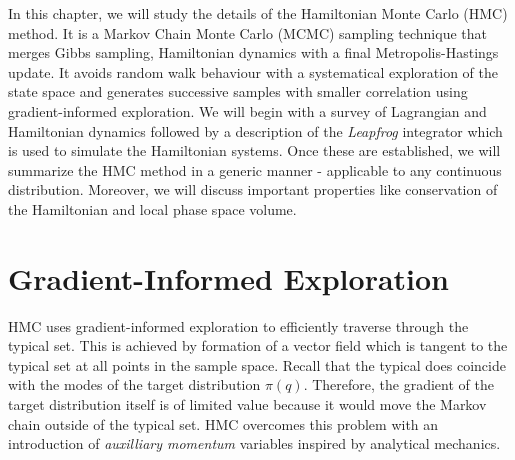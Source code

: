 In this chapter, we will study the details of the Hamiltonian Monte Carlo (HMC) method.
It is a Markov Chain Monte Carlo (MCMC) sampling technique that merges Gibbs sampling, 
Hamiltonian dynamics with a final Metropolis-Hastings update.
It avoids random walk behaviour with a systematical exploration of the state space 
and generates successive samples with smaller correlation using gradient-informed exploration. 
We will begin with a survey of Lagrangian and Hamiltonian dynamics followed by a description of
the \textit{Leapfrog} integrator which is used to simulate the Hamiltonian systems. Once these are established, we will summarize the 
HMC method in a generic manner - applicable to any continuous distribution. Moreover, we will discuss important properties like conservation of the Hamiltonian
and local phase space volume.


\section{Gradient-Informed Exploration}
HMC uses gradient-informed exploration to efficiently traverse through the typical set.
This is achieved by formation of a vector field which is tangent to the typical set at all points
in the sample space. Recall that the typical does coincide with the modes of the target
distribution $\pi(q)$. Therefore, the gradient of the target distribution itself is of limited
value because it would move the Markov chain outside of the typical set. HMC overcomes this
problem with an introduction of \textit{auxilliary momentum} variables inspired by analytical mechanics.

